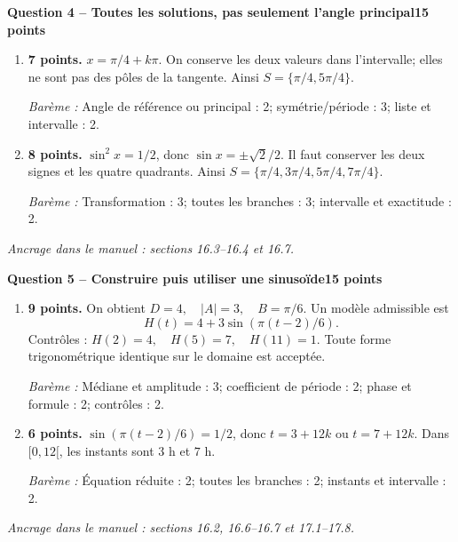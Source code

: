 \documentclass[11pt,a4paper]{article}
\begin{document}
\newpage
{\large\bfseries Question 4 -- Toutes les solutions, pas seulement l’angle principal}\hfill\textbf{15 points}\par
\begin{enumerate}
\item \textbf{7 points.} \(x=\pi/4+k\pi\). On conserve les deux valeurs dans l’intervalle; elles ne sont pas des pôles de la tangente. Ainsi \(S=\{\pi/4,5\pi/4\}\).
\par{\small\textit{Barème : }Angle de référence ou principal : 2; symétrie/période : 3; liste et intervalle : 2.}
\item \textbf{8 points.} \(\sin^2x=1/2\), donc \(\sin x=\pm\sqrt2/2\). Il faut conserver les deux signes et les quatre quadrants. Ainsi \(S=\{\pi/4,3\pi/4,5\pi/4,7\pi/4\}\).
\par{\small\textit{Barème : }Transformation : 3; toutes les branches : 3; intervalle et exactitude : 2.}
\end{enumerate}
\vfill {\small\textit{Ancrage dans le manuel : sections 16.3--16.4 et 16.7.}}

\newpage
{\large\bfseries Question 5 -- Construire puis utiliser une sinusoïde}\hfill\textbf{15 points}\par
\begin{enumerate}
\item \textbf{9 points.} On obtient \(D=4,\quad |A|=3,\quad B=\pi/6\). Un modèle admissible est \[H(t)=4+3\sin(\pi(t-2)/6).\] Contrôles : \(H(2)=4,\quad H(5)=7,\quad H(11)=1\). Toute forme trigonométrique identique sur le domaine est acceptée.
\par{\small\textit{Barème : }Médiane et amplitude : 3; coefficient de période : 2; phase et formule : 2; contrôles : 2.}
\item \textbf{6 points.} \(\sin(\pi(t-2)/6)=1/2\), donc \(t=3+12k\) ou \(t=7+12k\). Dans \([0,12[\), les instants sont \(3\) h et \(7\) h.
\par{\small\textit{Barème : }Équation réduite : 2; toutes les branches : 2; instants et intervalle : 2.}
\end{enumerate}
\vfill {\small\textit{Ancrage dans le manuel : sections 16.2, 16.6--16.7 et 17.1--17.8.}}
\end{document}
